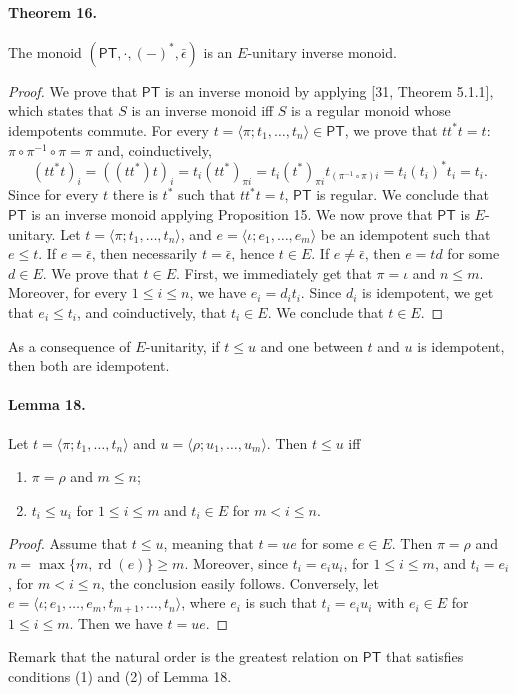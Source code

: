 \documentclass[10pt,a4paper]{amsart}
\begin{document}
\paragraph{Theorem 16.} The monoid $(\mathsf{PT},\cdot,(-)^*,\bar\epsilon)$ is an $E$-unitary inverse monoid.
\begin{proof}
We prove that $\mathsf{PT}$ is an inverse monoid by applying [31, Theorem 5.1.1], which states that $S$ is an inverse monoid iff $S$ is a regular monoid whose idempotents commute.
For every $t=\langle\pi;t_1,\ldots,t_n\rangle\in\mathsf{PT}$, we prove that $tt^*t=t$: $\pi\circ\pi^{-1}\circ\pi=\pi$ and, coinductively,
\[
(tt^*t)_i=((tt^*)t)_i=t_i(tt^*)_{\pi i}=t_i(t^*)_{\pi i}t_{(\pi^{-1}\circ\pi)i}=t_i(t_i)^*t_i=t_i.
\]
Since for every $t$ there is $t^*$ such that $tt^*t=t$, $\mathsf{PT}$ is regular. We conclude that $\mathsf{PT}$ is an inverse monoid applying Proposition 15.
We now prove that $\mathsf{PT}$ is $E$-unitary.
Let $t=\langle\pi;t_1,\ldots,t_n\rangle$, and $e=\langle\iota;e_1,\ldots,e_m\rangle$ be an idempotent such that $e\le t$.
If $e=\bar\epsilon$, then necessarily $t=\bar\epsilon$, hence $t\in E$.
If $e\ne\bar\epsilon$, then $e=td$ for some $d\in E$. We prove that $t\in E$.
First, we immediately get that $\pi=\iota$ and $n\le m$.
Moreover, for every $1\le i\le n$, we have $e_i=d_it_i$.
Since $d_i$ is idempotent, we get that $e_i\le t_i$, and coinductively, that $t_i\in E$. We conclude that $t\in E$.
\end{proof}
As a consequence of $E$-unitarity, if $t\le u$ and one between $t$ and $u$ is idempotent, then both are idempotent.
\paragraph{Lemma 18.} Let $t=\langle\pi;t_1,\ldots,t_n\rangle$ and $u=\langle\rho;u_1,\ldots,u_m\rangle$. Then $t\le u$ iff
\begin{enumerate}
\item $\pi=\rho$ and $m\le n$;
\item $t_i\le u_i$ for $1\le i\le m$ and $t_i\in E$ for $m<i\le n$.
\end{enumerate}
\begin{proof}
Assume that $t\le u$, meaning that $t=ue$ for some $e\in E$. Then $\pi=\rho$ and $n=\max\{m,\operatorname{rd}(e)\}\ge m$.
Moreover, since $t_i=e_iu_i$, for $1\le i\le m$, and $t_i=e_i$, for $m<i\le n$, the conclusion easily follows.
Conversely, let $e=\langle\iota;e_1,\ldots,e_m,t_{m+1},\ldots,t_n\rangle$, where $e_i$ is such that $t_i=e_iu_i$ with $e_i\in E$ for $1\le i\le m$. Then we have $t=ue$.
\end{proof}
Remark that the natural order is the greatest relation on $\mathsf{PT}$ that satisfies conditions (1) and (2) of Lemma 18.
\end{document}
